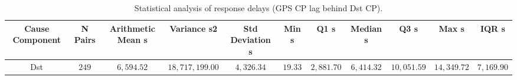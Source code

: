 \vspace{-3pt}
\begin{table}[H]
\caption{Statistical analysis of response delays (GPS CP lag behind Dst CP).\label{tab:Response_Delay_Summary_Statistics_300_Dst}}
\begin{tabularx}{\textwidth}{CCCCCCCCCCC}
\toprule
\textbf{Cause Component} & \textbf{N Pairs} & \textbf{Arithmetic Mean s} & \textbf{Variance s2} & \textbf{Std Deviation s} & \textbf{Min s} & \textbf{Q1 s} & \textbf{Median s} & \textbf{Q3 s} & \textbf{Max s} & \textbf{IQR s} \\
\midrule
Dst & $249$ & $6,594.52$ & $18,717,199.00$ & $4,326.34$ & $19.33$ & $2,881.70$ & $6,414.32$ & $10,051.59$ & $14,349.72$ & $7,169.90$ \\
\bottomrule
\end{tabularx}
\end{table}
\vspace{-3pt}
